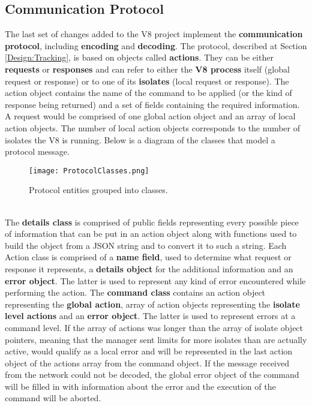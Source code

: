 \documentclass{l4proj}
\begin{document}
\subsection{Communication Protocol}
\hspace*{3em} The last set of changes added to the V8 project implement the \textbf{communication protocol}, including \textbf{encoding} and \textbf{decoding}. The protocol, described at Section \ref{Design:Tracking}, is based on objects called \textbf{actions}. They can be either \textbf{requests} or \textbf{responses} and can refer to either the \textbf{V8 process} itself (global request or response) or to one of its \textbf{isolates} (local request or response). The action object contains the name of the command to be applied (or the kind of response being returned) and a set of fields containing the required information. A request would be comprised of one global action object and an array of local action objects. The number of local action objects corresponds to the number of isolates the V8 is running. Below is a diagram of the classes that model a protocol message.     
\begin{figure}[!ht]
  \centering
    \texttt{[image: ProtocolClasses.png]}
  \caption{Protocol entities grouped into classes.}
\end{figure}
\\
\hspace*{3em} The \textbf{details class} is comprised of public fields representing every possible piece of information that can be put in an action object along with functions used to build the object from a JSON string and to convert it to such a string. Each Action class is comprised of a \textbf{name field}, used to determine what request or response it represents, a \textbf{details object} for the additional information and an \textbf{error object}. The latter is used to represent any kind of error encountered while performing the action. The \textbf{command class} contains an action object representing the \textbf{global action}, array of action objects representing the \textbf{isolate level actions} and an \textbf{error object}. The latter is used to represent errors at a command level. If the array of actions was longer than the array of isolate object pointers, meaning that the manager sent limits for more isolates than are actually active, would qualify as a local error and will be represented in the last action object of the actions array from the command object. If the message received from the network could not be decoded, the global error object of the command will be filled in with information about the error and the execution of the command will be aborted.
\end{document}
